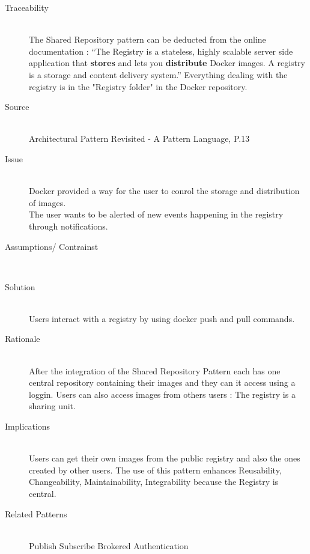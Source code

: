 \begin{description}
\item[Traceability]~\\
The Shared Repository pattern can be deducted from the online documentation : \cite{dockregistry} ``The Registry is a stateless, highly scalable server side application that \textbf{stores} and lets you \textbf{distribute} Docker images. A registry is a storage and content delivery system.''
Everything dealing with the registry is in the "Registry folder" in the Docker repository.


\item[Source]~\\

Architectural Pattern Revisited - A Pattern Language, P.13 \cite{avgeriou2005architectural}

\item[Issue]~\\
Docker provided a way for the user to conrol the storage and distribution of images. \\
The user wants to be alerted of new events happening in the registry through notifications. %

\item[Assumptions/ Contrainst]~\\

\item[Solution]~\\ %
Users interact with a registry by using docker push and pull commands. %

\item[Rationale]~\\ %
 After the integration of the Shared Repository Pattern each has one central repository containing their images and they can it access using a loggin.
 Users can also access images from others users : The registry is a sharing unit. \\
 
 \item [Implications]~\\
Users can get their own images from the public registry and also the ones created by other users. %
The use of this pattern enhances Reusability, Changeability, Maintainability, Integrability because the Registry is central.

\item [Related Patterns]~\\
Publish Subscribe 
Brokered Authentication


\end{description}
